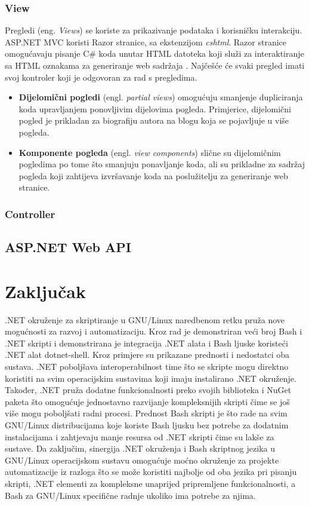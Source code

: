 \documentclass{foi}
\begin{document}
\subsection{View}
Pregledi (eng. \textit{Views}) se koriste za prikazivanje podataka i korisničku interakciju. ASP.NET MVC koristi Razor stranice, sa ekstenzijom \textit{cshtml}. Razor stranice omogućavaju pisanje C\# koda unutar HTML datoteka koji služi za interaktiranje sa HTML oznakama za generiranje web sadržaja \cite{Smith2022}. Najčešće će svaki pregled imati svoj kontroler koji je odgovoran za rad s pregledima.
\begin{itemize}
    \item \textbf{Dijelomični pogledi} (engl. \textit{partial views}) omogućuju smanjenje dupliciranja koda upravljanjem ponovljivim dijelovima pogleda. Primjerice, dijelomični pogled je prikladan za biografiju autora na blogu koja se pojavljuje u više pogleda. 
    
    \item \textbf{Komponente pogleda} (engl. \textit{view components}) slične su dijelomičnim pogledima po tome što smanjuju ponavljanje koda, ali su prikladne za sadržaj pogleda koji zahtijeva izvršavanje koda na poslužitelju za generiranje web stranice.
\end{itemize}
\subsection{Controller}
\section{ASP.NET Web API}

\chapter{Zaključak}
.NET okruženje za skriptiranje u GNU/Linux naredbenom retku pruža nove mogućnosti za razvoj i automatizaciju. Kroz rad je demonstriran veći broj Bash i .NET skripti i demonstrirana je integracija .NET alata i Bash ljuske koristeći .NET alat dotnet-shell. Kroz primjere su prikazane prednosti i nedostatci oba sustava. .NET poboljšava interoperabilnost time što se skripte mogu direktno koristiti na svim operacijskim sustavima koji imaju instalirano .NET okruženje. Također, .NET pruža dodatne funkcionalnosti preko svojih biblioteka i NuGet paketa što omogućuje jednostavno razvijanje kompleksnijih skripti čime se još više mogu poboljšati radni procesi. Prednost Bash skripti je što rade na svim GNU/Linux distribucijama koje koriste Bash ljusku bez potrebe za dodatnim instalacijama i zahtjevaju manje resursa od .NET skripti čime su lakše za sustave. Da zaključim, sinergija .NET okruženja i Bash skriptnog jezika u GNU/Linux operacijskom sustavu omogućuje moćno okruženje za projekte automatizacije iz razloga što se može koristiti najbolje od oba jezika pri pisanju skripti, .NET elementi za kompleksne unaprijed pripremljene funkcionalnosti, a Bash za GNU/Linux specifične radnje ukoliko ima potrebe za njima. 


\printbibliography[title=Popis literature]

\listoffigures
{}

\listoftables
{}
\end{document}

